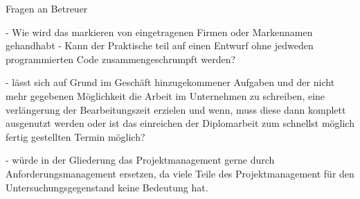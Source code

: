 Fragen an Betreuer

- Wie wird das markieren von eingetragenen Firmen oder Markennamen gehandhabt
- Kann der Praktische teil auf einen Entwurf ohne jedweden programmierten Code zusammengeschrumpft werden?

- lässt sich auf Grund im Geschäft hinzugekommener Aufgaben und der nicht mehr gegebenen Möglichkeit die Arbeit im Unternehmen zu schreiben, eine verlängerung der Bearbeitungszeit erzielen und wenn, muss diese dann komplett ausgenutzt werden oder ist das einreichen der Diplomarbeit zum schnellst möglich fertig gestellten Termin möglich?

- würde in der Gliederung das Projektmanagement gerne durch Anforderungsmanagement ersetzen, da viele Teile des Projektmanagement für den Untersuchungsgegenstand keine Bedeutung hat.


